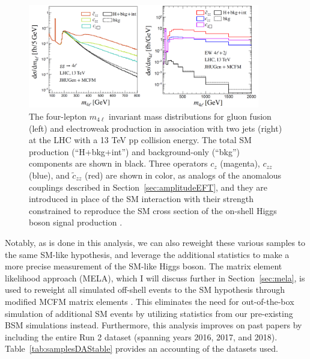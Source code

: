 \begin{figure}[!hbt]
\centering
\includegraphics[width=0.9\textwidth,clip] {figures/offshellAC_BSI.png}
\caption{ The four-lepton $m_{4\ell}$ invariant mass distributions for gluon fusion (left) and electroweak production in association with two jets (right) at the LHC with a 13 TeV pp collision energy. The total SM production (“H+bkg+int”) and background-only (“bkg”) components are shown in black. Three operators $c_z$ (magenta), $c_{zz}$ (blue), and $\tilde{c}_{zz}$ (red) are shown in color, as analogs of the anomalous couplings described in Section~\ref{sec:amplitudeEFT}, and they are introduced in place of the SM interaction with their strength constrained to reproduce the SM cross section of the on-shell Higgs boson signal production \cite{offshellWGnote}.}
\label{fig:offshellAC_BSI}
\end{figure}

Notably, as is done in this analysis, we can also reweight these various samples to the same SM-like hypothesis, and leverage the additional statistics to make a more precise measurement of the SM-like Higgs boson. The matrix element likelihood approach (MELA), which I will discuss further in Section~\ref{sec:mela}, is used to reweight all simulated off-shell events to the SM hypothesis through modified MCFM matrix elements \cite{12077235,10073492}. This eliminates the need for out-of-the-box simulation of additional SM events by utilizing statistics from our pre-existing BSM simulations instead. Furthermore, this analysis improves on past papers \cite{190100174} by including the entire Run 2 dataset (spanning years 2016, 2017, and 2018). Table~\ref{tab:samplesDAStable} provides an accounting of the datasets used.

